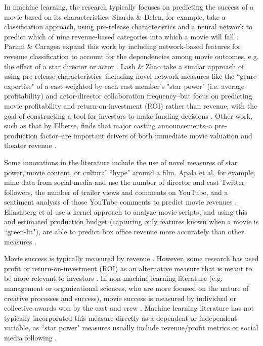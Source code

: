 \documentclass[12pt,english]{article}
\begin{document}
In machine learning, the research typically focuses on predicting the success of a movie based on its characteristics. Sharda \& Delen, for example, take a classification approach, using pre-release characteristics and a neural network to predict which of nine revenue-based categories into which a movie will fall \citep{sharda}. Parimi \& Caragea expand this work by including network-based features for revenue classification to account for the dependencies among movie outcomes, e.g. the effect of a star director or actor \citep{parimi}. Lash \& Zhao take a similar approach of using pre-release characteristics--including novel network measures like the ``genre expertise" of a cast weighted by each cast member's "star power" (i.e. average profitability) and actor-director collaboration frequency--but focus on predicting movie profitability and return-on-investment (ROI) rather than revenue, with the goal of constructing a tool for investors to make funding decisions \citep{lash}. Other work, such as that by Elberse, finds that major casting announcements--a pre-production factor--are important drivers of both immediate movie valuation and theater revenue \citep{elberse}. 

Some innovations in the literature include the use of novel measures of star power, movie content, or cultural ``hype" around a film. Apala et al, for example, mine data from social media and use the number of director and cast Twitter followers, the number of trailer views and comments on YouTube, and a sentiment analysis of those YouTube comments to predict movie revenues \citep{apala}. Eliashberg et al use a kernel approach to analyze movie scripts, and using this and estimated production budget (capturing only features known when a movie is ``green-lit"), are able to predict box office revenue more accurately than other measures \citep{eliashberg}. 

Movie success is typically measured by revenue \citep{apala, parimi, simonoff, gopinath, sharda, elberse, eliashberg}. However, some research has used profit or return-on-investment (ROI) as an alternative measure that is meant to be more relevant to investors \citep{lash}. In non-machine learning literature (e.g. management or organizational sciences, who are more focused on the nature of creative processes and success), movie success is measured by individual or collective awards won by the cast and crew \citep{cattani}. Machine learning literature has not typically incorporated this measure directly as a dependent or independent variable, as ``star power" measures usually include revenue/profit metrics or social media following \citep{lash, sharda}. 
\end{document}
